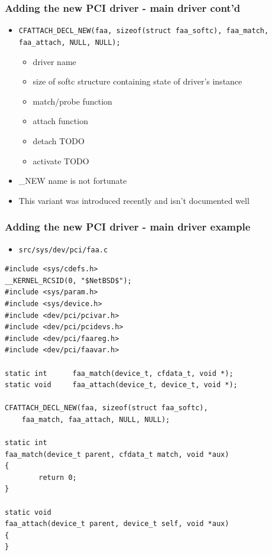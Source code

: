 \documentclass[dvipsnames,table]{beamer}
\begin{document}
\begin{frame}
\frametitle{Adding the new PCI driver - main driver cont'd}
\begin{itemize}
	\item {\tt CFATTACH\_DECL\_NEW(faa, sizeof(struct faa\_softc),
    faa\_match, faa\_attach, NULL, NULL);}
	\begin{itemize}
		\item driver name
		\item size of softc structure containing state of driver's instance
		\item match/probe function
		\item attach function
		\item detach TODO
		\item activate TODO
	\end{itemize}
	\item \_NEW name is not fortunate
	\item This variant was introduced recently and isn't documented well
\end{itemize}
\end{frame}




\begin{frame}[fragile]
\frametitle{Adding the new PCI driver - main driver example}
\scriptsize
\begin{itemize}
	\item {\tt src/sys/dev/pci/faa.c}
\end{itemize}
\begin{lstlisting}
#include <sys/cdefs.h>
__KERNEL_RCSID(0, "$NetBSD$");
#include <sys/param.h>
#include <sys/device.h>
#include <dev/pci/pcivar.h>
#include <dev/pci/pcidevs.h>
#include <dev/pci/faareg.h>
#include <dev/pci/faavar.h>

static int      faa_match(device_t, cfdata_t, void *);
static void     faa_attach(device_t, device_t, void *);

CFATTACH_DECL_NEW(faa, sizeof(struct faa_softc),
    faa_match, faa_attach, NULL, NULL);

static int
faa_match(device_t parent, cfdata_t match, void *aux)
{
        return 0;
}

static void
faa_attach(device_t parent, device_t self, void *aux)
{ 
}
\end{lstlisting}
\end{frame}
\end{document}
